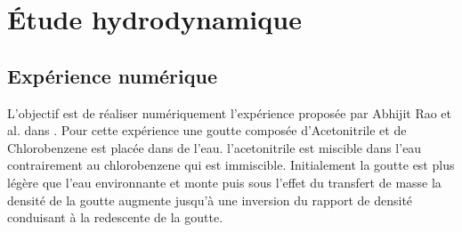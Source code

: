 \chapter{Étude hydrodynamique}
\section{Expérience numérique}

L'objectif est de réaliser numériquement l'expérience proposée par Abhijit Rao et al. dans \cite{rao_influence_2015}. Pour cette expérience une goutte composée d'Acetonitrile et de Chlorobenzene est placée dans de l'eau. l'acetonitrile est miscible dans l'eau contrairement au chlorobenzene qui est immiscible. Initialement la goutte est plus légère que l'eau environnante et monte puis sous l'effet du transfert de masse la densité de la goutte augmente jusqu’à une inversion du rapport de densité conduisant à la redescente de la goutte.
